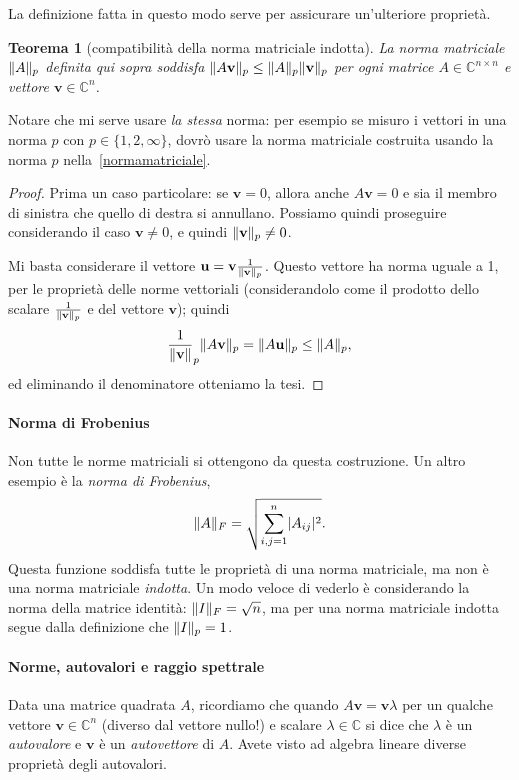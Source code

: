 \documentclass[a4paper]{report}
\DeclarePairedDelimiter{\abs}{\lvert}{\rvert}
\DeclarePairedDelimiter{\norm}{\lVert}{\rVert}
\newtheorem{theorem}{Teorema}[chapter]
\theoremstyle{definition}
\theoremstyle{remark}
\begin{document}
La definizione fatta in questo modo serve per assicurare un'ulteriore proprietà.
\begin{theorem}[compatibilità della norma matriciale indotta] \label{thm:compatibilita}
La norma matriciale $\norm{A}_p$ definita qui sopra soddisfa $\norm{A\mathbf{v}}_p \leq \norm{A}_p\norm{\mathbf{v}}_p$ per ogni matrice $A\in\mathbb{C}^{n\times n}$ e vettore $\mathbf{v}\in\mathbb{C}^n$.
\end{theorem}
Notare che mi serve usare \emph{la stessa} norma: per esempio se misuro i vettori in una norma $p$ con $p\in\{1,2,\infty\}$, dovrò usare la norma matriciale costruita usando la norma $p$ nella~\eqref{normamatriciale}.
\begin{proof}
Prima un caso particolare: se $\mathbf{v}=0$, allora anche $A\mathbf{v}=0$ e sia il membro di sinistra che quello di destra si annullano. Possiamo quindi proseguire considerando il caso $\mathbf{v}\neq 0$, e quindi $\norm{\mathbf{v}}_p \neq 0$.

Mi basta considerare il vettore $\mathbf{u} = \mathbf{v} \frac{1}{\norm{\mathbf{v}}_p}$. Questo vettore ha norma uguale a 1, per le proprietà delle norme vettoriali (considerandolo come il prodotto dello scalare $\frac{1}{\norm{\mathbf{v}}_p}$ e del vettore $\mathbf{v}$); quindi
\[
\frac{1}{\norm{\mathbf{v}}}_p \norm{A\mathbf{v}}_p  = \norm{A\mathbf{u}}_p \leq \norm{A}_p,
\]
ed eliminando il denominatore otteniamo la tesi.
\end{proof}

\paragraph{Norma di Frobenius}

Non tutte le norme matriciali si ottengono da questa costruzione. Un altro esempio è la \emph{norma di Frobenius},
\[
\norm{A}_F = \sqrt{\sum_{i,j=1}^n \abs{A_{ij}}^2}.
\]
Questa funzione soddisfa tutte le proprietà di una norma matriciale, ma non è una norma matriciale \emph{indotta}. Un modo veloce di vederlo è considerando la norma della matrice identità: $\norm{I}_F = \sqrt{n}$, ma per una norma matriciale indotta segue dalla definizione che $\norm{I}_p = 1$.

\paragraph{Norme, autovalori e raggio spettrale}

Data una matrice quadrata $A$, ricordiamo che quando $A\mathbf{v} = \mathbf{v}\lambda$ per un qualche vettore $\mathbf{v}\in\mathbb{C}^n$ (diverso dal vettore nullo!) e scalare $\lambda \in \mathbb{C}$ si dice che $\lambda$ è un \emph{autovalore} e $\mathbf{v}$ è un \emph{autovettore} di $A$. Avete visto ad algebra lineare diverse proprietà degli autovalori. 
\end{document}
